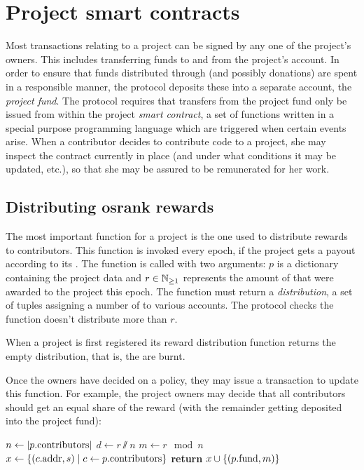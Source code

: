 \section{Project smart contracts}
\label{s:smart-contracts}

Most transactions relating to a project can be signed by any one of the
project's owners. This includes transferring funds to and from the project's
account. In order to ensure that funds distributed through \osrank{} (and
possibly donations) are spent in a responsible manner, the protocol deposits
these into a separate account, the \emph{project fund}. The protocol requires
that transfers from the project fund only be issued from within the project
\emph{smart contract}, a set of functions written in a special purpose
programming language which are triggered when certain events arise. When a
contributor decides to contribute code to a project, she may inspect the
contract currently in place (and under what conditions it may be updated, etc.),
so that she may be assured to be remunerated for her work.

\subsection{Distributing osrank rewards}

The most important function for a project is the one used to distribute rewards
to contributors. This function is invoked every epoch, if the project gets a
payout according to its \osrank{}. The function is called with two arguments:
$p$ is a dictionary containing the project data and $r \in \mathbb{N}_{\geq 1}$ represents
the amount of \oscoin{} that were awarded to the project this epoch. The
function must return a \emph{distribution}, a set of tuples assigning a number
of \oscoin{} to various accounts. The protocol checks the function doesn't
distribute more than $r$.

When a project is first registered its reward distribution function returns the
empty distribution, that is, the \oscoin{} are burnt.

Once the owners have decided on a policy, they may issue a transaction to update
this function. For example, the project owners may decide that all contributors
should get an equal share of the reward (with the remainder getting deposited
into the project fund):
\begin{algorithmic}[1]
\State $n \gets |p.{\mathrm{contributors}}|$
\State $d \gets r \sslash n$
\State $m \gets r \mod n$
\State $x \gets \{ (c.{\mathrm{addr}}, s) \mid c \gets p.{\mathrm{contributors}} \}$
\State \textbf{return} $x \cup \{ (p.{\mathrm{fund}}, m) \}$
\EndProcedure
\end{algorithmic}

